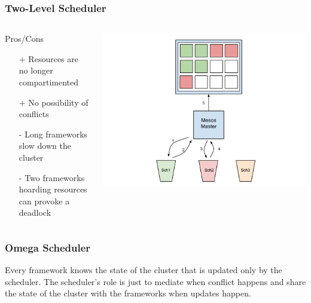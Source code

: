 \documentclass[notes=hide]{beamer}
\begin{document}
  \note{}

  \begin{frame}
    \frametitle{Two-Level Scheduler}
       \begin{columns}[T]
       \begin{column}{.5\textwidth}
        \begin{block}{Pros/Cons}
            \begin{itemize}
              \item[+] Resources are no longer compartimented
              \item[+] No possibility of conflicts
              \item[-] Long frameworks slow down the cluster
              \item[-] Two frameworks hoarding resources can provoke a deadlock
            \end{itemize}
        \end{block}
        \end{column}
        \begin{column}{.6\textwidth}
         \includegraphics[trim = 50mm 0mm 0mm 0mm,clip,scale=0.30,natwidth=960,natheight=720]{TwoLevel-slides.png}
        \end{column}
      \end{columns}
  \end{frame}

  \note{}

  \begin{frame}
    \frametitle{Omega Scheduler}
    \begin{definition}
      Every framework knows the state of the cluster that
      is updated only by the scheduler. The scheduler's role
      is just to mediate when conflict happens and share
      the state of the cluster with the frameworks when updates
      happen.
    \end{definition}
  \end{frame}
\end{document}

